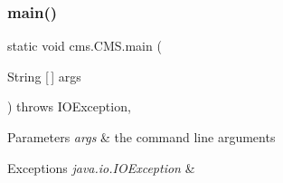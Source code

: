 \subsubsection{\texorpdfstring{main()}{main()}}
{\footnotesize\ttfamily static void cms.\+C\+M\+S.\+main (\begin{DoxyParamCaption}\item[{String \mbox{[}$\,$\mbox{]}}]{args }\end{DoxyParamCaption}) throws I\+O\+Exception\hspace{0.3cm}{\ttfamily [inline]}, {\ttfamily [static]}}


\begin{DoxyParams}{Parameters}
{\em args} & the command line arguments \\
\hline
\end{DoxyParams}

\begin{DoxyExceptions}{Exceptions}
{\em java.\+io.\+I\+O\+Exception} & \\
\hline
\end{DoxyExceptions}

